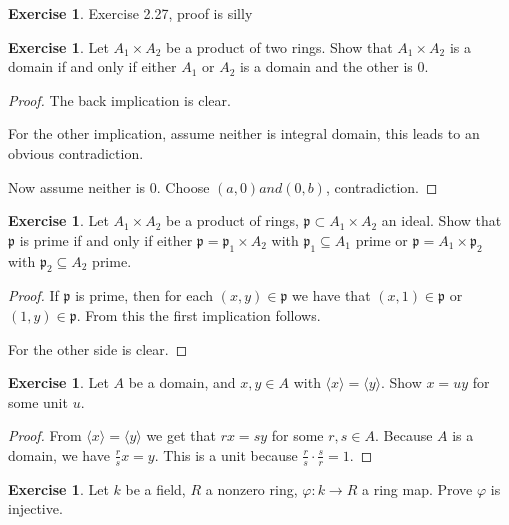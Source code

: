 \documentclass{book}
\theoremstyle{plain}
\theoremstyle{definition}
\newtheorem{exr}[thm]{Exercise}
\theoremstyle{custom_definition}
\begin{document}
\begin{exr}
  Exercise 2.27, proof is silly
\end{exr}

\begin{exr}
  Let \(A_1 \times A_2\) be a product of two rings. Show that \(A_1 \times A_2\) is a domain if and only if either \(A_1\) or \(A_2\) is a domain and the other is \(0\).
\end{exr}
\begin{proof}
  The back implication is clear.

  For the other implication, assume neither is integral domain, this leads to an obvious contradiction.

  Now assume neither is 0. Choose \((a, 0) and (0, b)\), contradiction.
\end{proof}

\begin{exr}
  Let \(A_1 \times A_2\) be a product of rings, \(\mathfrak{p} \subset A_1 \times A_2\) an ideal. Show that \(\mathfrak{p}\) is prime if and only if either \(\mathfrak{p} = \mathfrak{p}_1 \times A_2\) with \(\mathfrak{p}_1 \subseteq A_1\) prime or \(\mathfrak{p} = A_1 \times \mathfrak{p}_2\) with \(\mathfrak{p}_2 \subseteq A_2\) prime.
\end{exr}

\begin{proof}
  If \(\mathfrak{p}\) is prime, then for each \((x, y) \in \mathfrak{p}\) we have that \((x, 1) \in \mathfrak{p}\) or \((1, y) \in \mathfrak{p}\). From this the first implication follows.

  For the other side is clear.
\end{proof}

\begin{exr}
  Let \(A\) be a domain, and \(x, y \in A\) with \(\langle x \rangle = \langle y \rangle\). Show \(x = uy\) for some unit \(u\).
\end{exr}
\begin{proof}
  From \(\langle x \rangle = \langle y \rangle\) we get that \(r x = s y\) for some \(r, s \in A\). Because \(A\) is a domain, we have \(\frac{r}{s} x = y\). This is a unit because \(\frac{r}{s} \cdot \frac{s}{r} = 1\).
\end{proof}

\begin{exr}
  Let \(k\) be a field, \(R\) a nonzero ring, \(\varphi: k \longrightarrow R\) a ring map. Prove \(\varphi\) is injective.
\end{exr}
\end{document}
